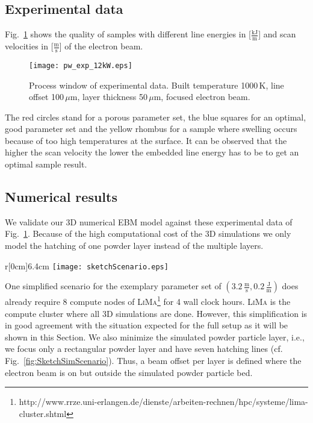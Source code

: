 \subsection{Experimental data}
Fig.~\ref{fig:pw_real} shows the quality of samples with different line energies in [$\frac{\text{kJ}}{\text{m}}$] and scan velocities in [$\frac{\text{m}}{\text{s}}$] of the electron beam. 
\begin{figure}[htbp!]
 \centering
 \texttt{[image: pw\_exp\_12kW.eps]}
 \caption{Process window of experimental data. Built temperature 1000\,K, line offset 100\,$\mu$m, layer thickness 50\,$\mu$m, focused electron beam.}
 \label{fig:pw_real}
\end{figure}
The red circles stand for a porous parameter set, the blue squares for an optimal, good parameter set and the yellow rhombus for a sample where 
swelling occurs because of too high temperatures at the surface. It can be observed that the higher the scan velocity the lower the embedded line energy has to be to get an optimal sample
result. 

\subsection{Numerical results}
We validate our 3D numerical EBM model against these experimental data of Fig.~\ref{fig:pw_real}. 
Because of the high computational cost of the 3D simulations we only model the hatching of one powder 
layer instead of the multiple layers.
\begin{wrapfigure}{r}[0cm]{6.4cm}
\centering 
 \texttt{[image: sketchScenario.eps]}
\caption{Sketch of simulation scenario.}\label{fig:SketchSimScenario}
 \vspace{-10pt}
\end{wrapfigure} 
One simplified scenario for the exemplary parameter set of $(3.2\,\frac{\text{m}}{\text{s}},0.2\,\frac{\text{J}}{\text{m}})$ does already require 8 compute 
nodes of \textsc{LiMa}\footnote{http://www.rrze.uni-erlangen.de/dienste/arbeiten-rechnen/hpc/systeme/lima-cluster.shtml} for 4 wall clock hours.  
\textsc{LiMa} is the compute cluster where all 3D simulations are done. However, this simplification is in good agreement with the situation
expected for the full setup as it will be shown in this Section. 
We also minimize the simulated powder particle layer, i.e., we focus only a rectangular powder layer and have seven hatching 
lines (cf. Fig.~\ref{fig:SketchSimScenario}). Thus, a beam offset per layer is defined where the electron beam is on but outside 
the simulated powder particle bed. 


